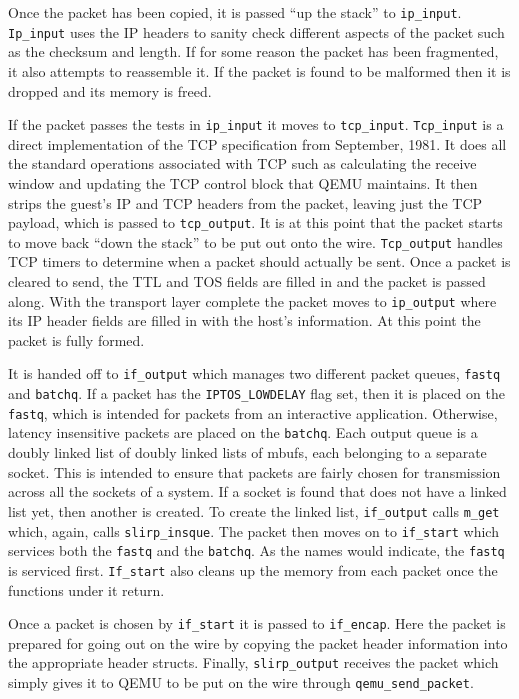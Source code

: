 Once the packet has been copied, it is passed ``up the stack'' to \texttt{ip\_input}. 
\texttt{Ip\_input} uses the IP headers to sanity check different aspects of the packet such as the checksum and length.
If for some reason the packet has been fragmented, it also attempts to reassemble it.
If the packet is found to be malformed then it is dropped and its memory is freed.

If the packet passes the tests in \texttt{ip\_input} it moves to \texttt{tcp\_input}.
\texttt{Tcp\_input} is a direct implementation of the TCP specification from September, 1981.
It does all the standard operations associated with TCP such as calculating the receive window and updating the TCP control block that QEMU maintains.
It then strips the guest's IP and TCP headers from the packet, leaving just the TCP payload, which is passed to \texttt{tcp\_output}.
It is at this point that the packet starts to move back ``down the stack'' to be put out onto the wire.
\texttt{Tcp\_output} handles TCP timers to determine when a packet should actually be sent.
Once a packet is cleared to send, the TTL and TOS fields are filled in and the packet is passed along.
With the transport layer complete the packet moves to \texttt{ip\_output} where its IP header fields are filled in with the host's information.
At this point the packet is fully formed.

It is handed off to \texttt{if\_output} which manages two different packet queues, \texttt{fastq} and \texttt{batchq}.
If a packet has the \texttt{IPTOS\_LOWDELAY} flag set, then it is placed on the \texttt{fastq}, which is intended for packets from an interactive application.
Otherwise, latency insensitive packets are placed on the \texttt{batchq}.
Each output queue is a doubly linked list of doubly linked lists of mbufs, each belonging to a separate socket.
This is intended to ensure that packets are fairly chosen for transmission across all the sockets of a system.
If a socket is found that does not have a linked list yet, then another is created.
To create the linked list, \texttt{if\_output} calls \texttt{m\_get} which, again, calls \texttt{slirp\_insque}.
The packet then moves on to \texttt{if\_start} which services both the \texttt{fastq} and the \texttt{batchq}.
As the names would indicate, the \texttt{fastq} is serviced first.
\texttt{If\_start} also cleans up the memory from each packet once the functions under it return.

Once a packet is chosen by \texttt{if\_start} it is passed to \texttt{if\_encap}.
Here the packet is prepared for going out on the wire by copying the packet header information into the appropriate header structs.
Finally, \texttt{slirp\_output} receives the packet which simply gives it to QEMU to be put on the wire through \texttt{qemu\_send\_packet}. 

